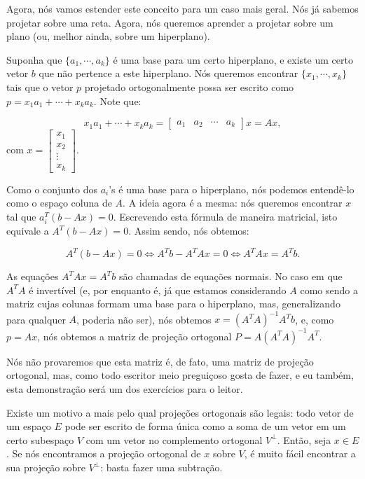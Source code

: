 Agora, nós vamos estender este conceito para um caso mais geral. Nós já sabemos projetar sobre uma reta. Agora, nós queremos aprender a projetar sobre um plano (ou, melhor ainda, sobre um hiperplano).

Suponha que $\{a_1, \cdots, a_k\}$ é uma base para um certo hiperplano, e existe um certo vetor $b$ que não pertence a este hiperplano. Nós queremos encontrar $\{x_1, \cdots, x_k\}$ tais que o vetor $p$ projetado ortogonalmente possa ser escrito como $p = x_1a_1 + \cdots + x_ka_k$. Note que:

$$
x_1a_1 + \cdots + x_ka_k = \begin{bmatrix}
	a_1 & a_2 & \cdots & a_k
\end{bmatrix}x = Ax,
$$
com $x = \begin{bmatrix}
	x_1 \\
	x_2 \\
	\vdots \\
	x_k
\end{bmatrix}$.

Como o conjunto dos $a_i$'s é uma base para o hiperplano, nós podemos entendê-lo como o espaço coluna de $A$. A ideia agora é a mesma: nós queremos encontrar $x$ tal que $a_i^T(b - Ax) = 0$. Escrevendo esta fórmula de maneira matricial, isto equivale a $A^T(b - Ax) = 0$. Assim sendo, nós obtemos:

$$
A^T(b - Ax) = 0\iff A^Tb - A^TAx = 0\iff A^TAx = A^Tb.
$$

As equações $A^TAx = A^Tb$ são chamadas de equações normais. No caso em que $A^TA$ é invertível (e, por enquanto é, já que estamos considerando $A$ como sendo a matriz cujas colunas formam uma base para o hiperplano, mas, generalizando para qualquer $A$, poderia não ser), nós obtemos $x = (A^TA)^{-1}A^Tb$, e, como $p = Ax$, nós obtemos a matriz de projeção ortogonal $P = A(A^TA)^{-1}A^T$.

Nós não provaremos que esta matriz é, de fato, uma matriz de projeção ortogonal, mas, como todo escritor meio preguiçoso gosta de fazer, e eu também, esta demonstração será um dos exercícios para o leitor.

Existe um motivo a mais pelo qual projeções ortogonais são legais: todo vetor de um espaço $E$ pode ser escrito de forma única como a soma de um vetor em um certo subespaço $V$ com um vetor no complemento ortogonal $V^\perp$. Então, seja $x\in E$. Se nós encontramos a projeção ortogonal de $x$ sobre $V$, é muito fácil encontrar a sua projeção sobre $V^\perp$: basta fazer uma subtração.

